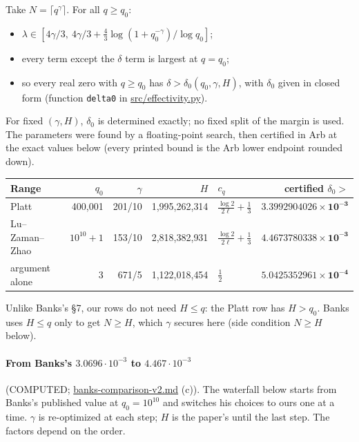 \documentclass[11pt]{article}
\begin{document}
Take $N=\lceil q^\gamma\rceil$. For all $q\ge q_0$:
\begin{itemize}
\item $\lambda\in[4\gamma/3,\ 4\gamma/3 + \tfrac43\log(1+q_0^{-\gamma})/\log q_0]$;
\item every term except the $\delta$ term is largest at $q=q_0$;
\item so every real zero with $q\ge q_0$ has $\delta>\delta_0(q_0,\gamma,H)$, with $\delta_0$ given in closed form (function \texttt{delta0} in \url{src/effectivity.py}).
\end{itemize}
For fixed $(\gamma,H)$, $\delta_0$ is determined exactly; no fixed split of the margin is used. The parameters were found by a floating-point search, then certified in Arb at the exact values below (every printed bound is the Arb lower endpoint rounded down).

\begin{center}
\begin{tabular}{@{}lrrrlr@{}}
\toprule
Range & $q_0$ & $\gamma$ & $H$ & $c_q$ & certified $\delta_0 >$\\
\midrule
Platt & 400{,}001 & 201/10 & 1{,}995{,}262{,}314 & $\frac{\log 2}{2\ell}+\frac13$ & $\mathbf{3.3992904026\times10^{-3}}$\\
Lu--Zaman--Zhao & $10^{10}+1$ & 153/10 & 2{,}818{,}382{,}931 & $\frac{\log 2}{2\ell}+\frac13$ & $\mathbf{4.4673780338\times10^{-3}}$\\
argument alone & 3 & 671/5 & 1{,}122{,}018{,}454 & $\frac12$ & $\mathbf{5.0425352961\times10^{-4}}$\\
\bottomrule
\end{tabular}
\end{center}

Unlike Banks's \S7, our rows do not need $H\le q$: the Platt row has $H>q_0$. Banks uses $H\le q$ only to get $N\ge H$, which $\gamma$ secures here (side condition $N\ge H$ below).

\paragraph{From Banks's $3.0696\cdot10^{-3}$ to $4.467\cdot10^{-3}$} (COMPUTED; \url{banks-comparison-v2.md} (c)). The waterfall below starts from Banks's published value at $q_0=10^{10}$ and switches his choices to ours one at a time. $\gamma$ is re-optimized at each step; $H$ is the paper's until the last step. The factors depend on the order.
\end{document}
